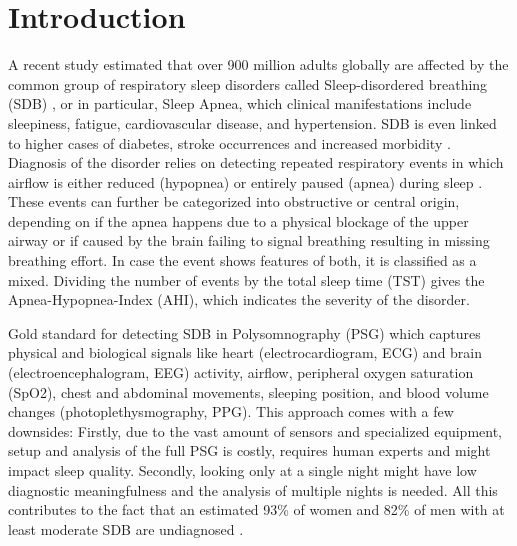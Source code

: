 \chapter{Introduction \label{Chapter-Intro}}

A recent study estimated that over 900 million adults globally are affected by the common group of respiratory sleep disorders called Sleep-disordered breathing (SDB) \cite{benjafield2019estimation}, or in particular, Sleep Apnea, which clinical manifestations include sleepiness, fatigue, cardiovascular disease, and hypertension. SDB is even linked to higher cases of diabetes, stroke occurrences and increased morbidity \cite{dempsey2010dempsey,patil2007adult,young2002epidemiology}.
Diagnosis of the disorder relies on detecting repeated respiratory events in which airflow is either reduced (hypopnea) or entirely paused (apnea) during sleep \cite{dempsey2010dempsey,gould2012sleep}. These events can further be categorized into obstructive or central origin, depending on if the apnea happens due to a physical blockage of the upper airway or if caused by the brain failing to signal breathing resulting in missing breathing effort. In case the event shows features of both, it is classified as a mixed. Dividing the number of events by the total sleep time (TST) gives the Apnea-Hypopnea-Index (AHI), which indicates the severity of the disorder.

Gold standard for detecting SDB in Polysomnography (PSG) which captures physical and biological signals like heart (electrocardiogram, ECG) and brain (electroencephalogram, EEG) activity, airflow, peripheral oxygen saturation (SpO2), chest and abdominal movements, sleeping position, and blood volume changes (photoplethysmography, PPG).
This approach comes with a few downsides: Firstly, due to the vast amount of sensors and specialized equipment, setup and analysis of the full PSG is costly, requires human experts and might impact sleep quality. Secondly, looking only at a single night might have low diagnostic meaningfulness \cite{toussaint1995first} and the analysis of multiple nights is needed. All this contributes to the fact that an estimated 93\% of women and 82\% of men with at least moderate SDB are undiagnosed \cite{young1997estimation}.

